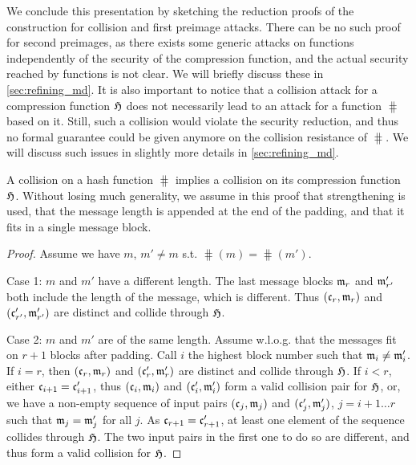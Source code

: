 We conclude this presentation by sketching the reduction proofs of the construction for collision and first preimage attacks. There can be no such proof
for second preimages, as there exists some generic attacks on \merkdam functions independently of the security of the compression function, and the actual
security reached by \merkdam functions is not clear. We will
briefly discuss these in \autoref{sec:refining_md}.
It is also important to notice that a collision attack for a compression function $\operatorname{\mathfrak{H}}$ does not necessarily lead
to an attack for a \merkdam function $\hash$ based on it. Still, such a collision would violate the security reduction, and thus no formal guarantee could be given
anymore on the collision resistance of $\hash$. We will discuss such issues in slightly more details in \autoref{sec:refining_md}.

\begin{prop}
A collision on a \merkdam hash function $\hash$ implies a collision on its compression function $\operatorname{\mathfrak{H}}$. Without losing much generality, we assume in this proof
that \merkdam strengthening is used, that the message length is appended at the end of the padding, and that it fits in a single message block.
\end{prop}
\begin{proof}
Assume we have $m$, $m' \neq m$ s.t. $\hash(m) = \hash(m')$.

Case 1: $m$ and $m'$ have a different length.
The last message blocks $\mathfrak{m}_r$ and $\mathfrak{m}'_{r'}$ both include the length
of the message, which is different. Thus $(\mathfrak{c}_r,\mathfrak{m}_r)$ and $(\mathfrak{c}'_{r'}, \mathfrak{m}'_{r'})$ are distinct and collide through $\operatorname{\mathfrak{H}}$.

Case 2: $m$ and $m'$ are of the same length. Assume w.l.o.g. that the messages fit on $r + 1$ blocks after padding.
Call $i$ the highest block number such that $\mathfrak{m}_{i} \neq \mathfrak{m}'_{i}$. If $i = r$, then $(\mathfrak{c}_r,\mathfrak{m}_r)$ and $(\mathfrak{c}'_{r}, \mathfrak{m}'_{r})$
are distinct and collide through $\operatorname{\mathfrak{H}}$. If $i < r$, either $\mathfrak{c}_{i+1} = \mathfrak{c}'_{i+1}$, thus $(\mathfrak{c}_i,\mathfrak{m}_i)$ and $(\mathfrak{c}'_{i}, \mathfrak{m}'_{i})$
form a valid collision pair for $\operatorname{\mathfrak{H}}$, or, we have a non-empty sequence of input pairs $(\mathfrak{c}_j, \mathfrak{m}_j)$ and $(\mathfrak{c}'_j, \mathfrak{m}'_j)$,
$j = i+1\ldots r$ such that $\mathfrak{m}_j = \mathfrak{m}'_j$ for all $j$. As $\mathfrak{c}_{r+1} = \mathfrak{c}'_{r+1}$, at least one element of the sequence
collides through $\operatorname{\mathfrak{H}}$. The two input pairs in the first one to do so are different, and thus form a valid collision for $\operatorname{\mathfrak{H}}$.
\end{proof}

